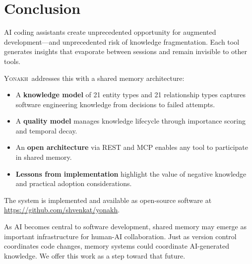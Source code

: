 \documentclass[10pt,journal,compsoc]{IEEEtran}
\newcommand{\yonakh}{\textsc{Yonakh}}
\begin{document}
\section{Conclusion}

AI coding assistants create unprecedented opportunity for augmented development---and unprecedented risk of knowledge fragmentation. Each tool generates insights that evaporate between sessions and remain invisible to other tools.

\yonakh\ addresses this with a shared memory architecture:

\begin{itemize}
\item A \textbf{knowledge model} of 21 entity types and 21 relationship types captures software engineering knowledge from decisions to failed attempts.

\item A \textbf{quality model} manages knowledge lifecycle through importance scoring and temporal decay.

\item An \textbf{open architecture} via REST and MCP enables any tool to participate in shared memory.

\item \textbf{Lessons from implementation} highlight the value of negative knowledge and practical adoption considerations.
\end{itemize}

The system is implemented and available as open-source software at \url{https://github.com/shvenkat/yonakh}.

As AI becomes central to software development, shared memory may emerge as important infrastructure for human-AI collaboration. Just as version control coordinates code changes, memory systems could coordinate AI-generated knowledge. We offer this work as a step toward that future.



\end{document}
